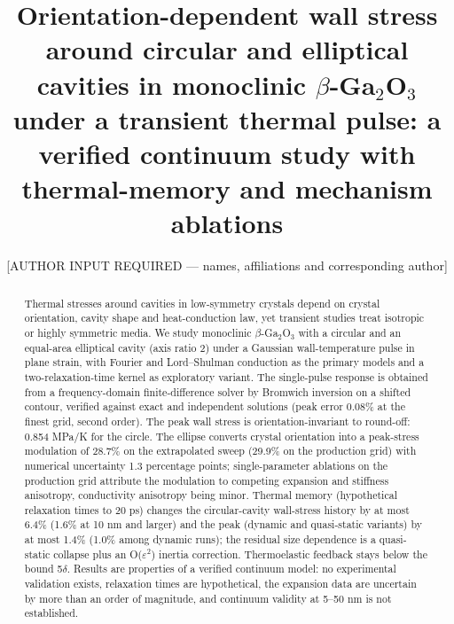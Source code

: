 \documentclass[preprint,12pt]{elsarticle}
\begin{document}
\begin{frontmatter}
\title{Orientation-dependent wall stress around circular and elliptical cavities in monoclinic $\beta$-Ga$_2$O$_3$ under a transient thermal pulse: a verified continuum study with thermal-memory and mechanism ablations}
\author{[AUTHOR INPUT REQUIRED --- names, affiliations and corresponding author]}
\begin{abstract}
Thermal stresses around cavities in low-symmetry crystals depend on crystal orientation, cavity shape and heat-conduction law, yet transient studies treat isotropic or highly symmetric media. We study monoclinic $\beta$-Ga$_2$O$_3$ with a circular and an equal-area elliptical cavity (axis ratio 2) under a Gaussian wall-temperature pulse in plane strain, with Fourier and Lord--Shulman conduction as the primary models and a two-relaxation-time kernel as exploratory variant. The single-pulse response is obtained from a frequency-domain finite-difference solver by Bromwich inversion on a shifted contour, verified against exact and independent solutions (peak error 0.08\% at the finest grid, second order). The peak wall stress is orientation-invariant to round-off: 0.854 MPa/K for the circle. The ellipse converts crystal orientation into a peak-stress modulation of 28.7\% on the extrapolated sweep (29.9\% on the production grid) with numerical uncertainty 1.3 percentage points; single-parameter ablations on the production grid attribute the modulation to competing expansion and stiffness anisotropy, conductivity anisotropy being minor. Thermal memory (hypothetical relaxation times to 20 ps) changes the circular-cavity wall-stress history by at most 6.4\% (1.6\% at 10 nm and larger) and the peak (dynamic and quasi-static variants) by at most 1.4\% (1.0\% among dynamic runs); the residual size dependence is a quasi-static collapse plus an O($\varepsilon^{2}$) inertia correction. Thermoelastic feedback stays below the bound 5$\delta$. Results are properties of a verified continuum model: no experimental validation exists, relaxation times are hypothetical, the expansion data are uncertain by more than an order of magnitude, and continuum validity at 5--50 nm is not established.
\end{abstract}
\begin{highlights}

\end{highlights}
\end{frontmatter}
\end{document}
